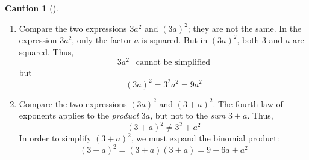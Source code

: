 \documentclass[10pt,]{book}
\theoremstyle{plain}
\theoremstyle{definition}
\newtheorem{warning}[theorem]{Caution}
\theoremstyle{definition}
\theoremstyle{definition}
\numberwithin{equation}{part}
\begin{document}
\begin{warning}[]\label{warning-7}
\leavevmode%
\begin{enumerate}[label=*\arabic**]
\item\hypertarget{li-197}{}Compare the two expressions \(3a^2\) and \((3a)^2\); they are not the same. In the expression \(3a^2\), only the factor \(a\) is squared. But in \((3a)^2\), both \(3\) and \(a\) are squared. Thus,%
\begin{equation*}
3a^2 ~~\text{  cannot be simplified}
\end{equation*}
but%
\begin{equation*}
(3a)^2 = 3^2a^2 = 9a^2
\end{equation*}
%
\item\hypertarget{li-198}{}Compare the two expressions \((3a)^2\) and \((3 + a)^2\). The fourth law of exponents applies to the \emph{product} \(3a\), but not to the \emph{sum} \(3+a\). Thus,%
\begin{equation*}
(3 + a)^2 \ne 3^2 + a^2
\end{equation*}
In order to simplify \((3 + a)^2\), we must expand the binomial product:%
\begin{equation*}
(3 + a)^2 = (3 + a) (3 + a) = 9 + 6a + a^2
\end{equation*}
%
\end{enumerate}
%
\end{warning}
\typeout{************************************************}
\typeout{************************************************}
\end{document}
